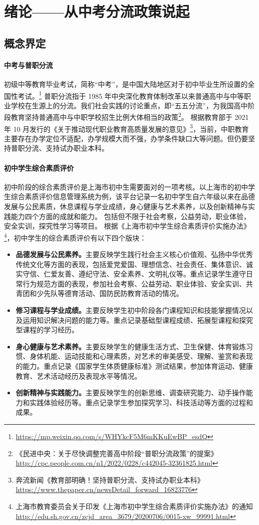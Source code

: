 \documentclass[12pt,UTF8]{ctexart}
\begin{document}
\section {绪论——从中考分流政策说起}
\subsection {概念界定}
\paragraph {中考与普职分流}
初级中等教育毕业考试，简称“中考”，是中国大陆地区对于初中毕业生所设置的全国性考试。\footnote{\url{https://mp.weixin.qq.com/s/WHYkcF5M6mKKuEwBP_esdQ}}
普职分流指于 1985
年中央深化教育体制改革以来普通高中与中等职业学校在生源上的分流。我们社会实践的讨论重点，即“五五分流”，为我国高中阶段教育坚持普通高中与中职学校招生比例大体相当的政策\footnote{《民进中央：关于尽快调整完善高中阶段“普职分流政策”的提案》
	\url{http://cpc.people.com.cn/n1/2022/0228/c442045-32361825.html}}。 
根据教育部于 2021 年 10 月发行的《关于推动现代职业教育高质量发展的意见》\footnote{奔流新闻《教育部明确！坚持普职分流、支持试办职业本科》
	\url{https://www.thepaper.cn/newsDetail_forward_16823776}}，当前，中职教育主要存在办学定位不适配，办学规模大而不强，办学条件缺口大等问题。但仍要坚持普职分流、支持试办职业本科。

\paragraph {初中学生综合素质评价}
初中阶段的综合素质评价是上海市初中生需要面对的一项考核。以上海市的初中学生综合素质评价信息管理系统为例，该平台记录一名初中学生自六年级以来在品德发展与公民素质，休息课程与学业成绩，身心健康与艺术素养，以及创新精神与实践能力四个方面的成就和能力。
包括但不限于社会考察，公益劳动，职业体验，安全实训，探究性学习等项目。
根据《上海市初中学生综合素质评价实施办法》\footnote{上海市教育委员会关于印发《上海市初中学生综合素质评价实施办法》的通知
	\url{http://edu.sh.gov.cn/zcjd_area_3679/20200706/0015-xw_99991.html}}，初中学生的综合素质评价有以下四个版块：
\begin {itemize}
\item [1)]
\textbf{品德发展与公民素养。}主要反映学生践行社会主义核心价值观、弘扬中华优秀传统文化等方面的表现，包括爱党爱国、理想信念、社会责任、集体意识、诚实守信、仁爱友善、遵纪守法、安全素养、文明礼仪等。重点记录学生遵守日常行为规范方面的表现，参加社会考察、公益劳动、职业体验、安全实训、共青团和少先队等德育活动、国防民防教育活动的情况。
\item [2)]
\textbf{修习课程与学业成绩。}主要反映学生初中阶段各门课程知识和技能掌握情况以及运用知识解决问题的能力等。重点记录基础型课程成绩、拓展型课程和探究型课程的学习经历。
\item [3)]
\textbf{身心健康与艺术素养。}主要反映学生的健康生活方式、卫生保健、体育锻炼习惯、身体机能、运动技能和心理素质，对艺术的审美感受、理解、鉴赏和表现的能力。重点记录《国家学生体质健康标准》测试结果，参加体育运动、健康教育、艺术活动经历及表现水平等情况。
\item [4)]
\textbf{创新精神与实践能力。}主要反映学生的创新思维、调查研究能力、动手操作能力和实践体验经历等。重点记录学生参加探究学习、科技活动等方面的过程和成果。
\end {itemize}
\end{document}
